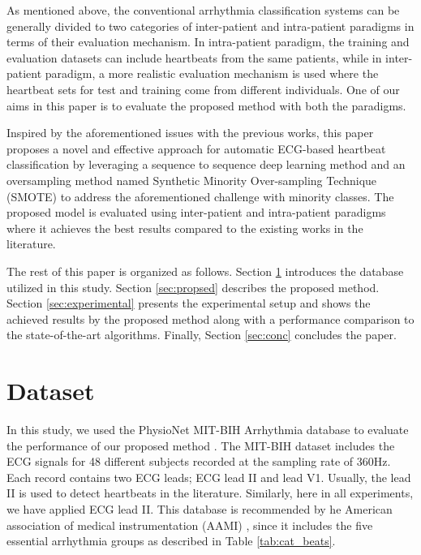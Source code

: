 \documentclass{article}
\begin{document}
As mentioned above, the conventional arrhythmia classification systems can be generally divided to two categories of inter-patient and intra-patient paradigms in terms of their evaluation mechanism. In intra-patient paradigm, the training and evaluation datasets can include heartbeats from the same patients, while in inter-patient paradigm, a more realistic evaluation mechanism is used where the heartbeat sets for test and training come from different individuals. One of our aims in this paper is to evaluate the proposed method with both the paradigms.

Inspired by the aforementioned issues with the previous works, this paper proposes a novel and effective approach for automatic ECG-based heartbeat classification by leveraging a sequence to sequence deep learning method and an oversampling method named Synthetic Minority Over-sampling Technique (SMOTE) to address the aforementioned challenge with minority classes. The proposed model is evaluated using inter-patient and intra-patient paradigms where it achieves the best results compared to the existing works in the literature.

The rest of this paper is organized as follows. Section \ref{sec:dataset} introduces the database utilized in this study. Section \ref{sec:propsed} describes the proposed method. Section \ref{sec:experimental} presents the experimental setup and shows the achieved results by the proposed method along with a performance comparison to the state-of-the-art algorithms. Finally, Section \ref{sec:conc} concludes the paper. 

\section{Dataset} 
\label{sec:dataset}
In this study, we used the PhysioNet MIT-BIH Arrhythmia database to evaluate the performance of our proposed method \cite{PhysioNetmitdb,moody2001impact}. The MIT-BIH dataset includes the ECG signals for 48 different subjects recorded at the sampling rate of 360Hz. Each record contains two ECG leads; ECG lead II and lead V1. Usually, the lead II is used to detect heartbeats in the literature. Similarly, here in all experiments, we have applied ECG lead II. This database is recommended by  he American association of medical instrumentation (AAMI) \cite{ec571998testing}, since it includes the five essential arrhythmia groups as described in Table \ref{tab:cat_beats}.
\end{document}
